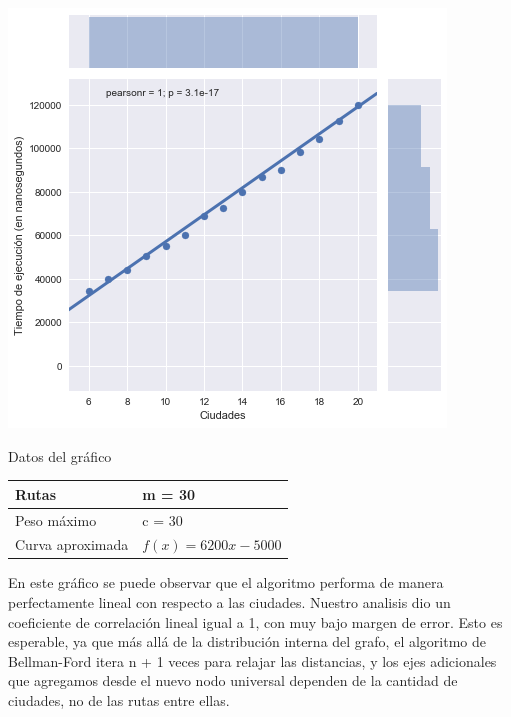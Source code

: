 \noindent
\begin{minipage}{0.55\textwidth}
	\hfill
	\includegraphics[scale=0.6]{imagenes/ej2-1.png}
\end{minipage}
\hfill
\begin{minipage}{0.42\textwidth}
	\begin{center}
		Datos del gráfico

		\begin{tabular}{ | l l |}
			\hline
			Rutas & m = 30 \\ \hline
			Peso máximo & c = 30 \\ \hline
			Curva aproximada & $f(x) = 6200 x - 5000$ \\
			\hline
		\end{tabular}
	\end{center}
\end{minipage}

En este gráfico se puede observar que el algoritmo performa de manera perfectamente lineal con respecto a las ciudades. Nuestro analisis dio un coeficiente de correlación lineal igual a 1, con muy bajo margen de error. Esto es esperable, ya que más allá de la distribución interna del grafo, el algoritmo de Bellman-Ford itera n + 1 veces para relajar las distancias, y los ejes adicionales que agregamos desde el nuevo nodo universal dependen de la cantidad de ciudades, no de las rutas entre ellas.

